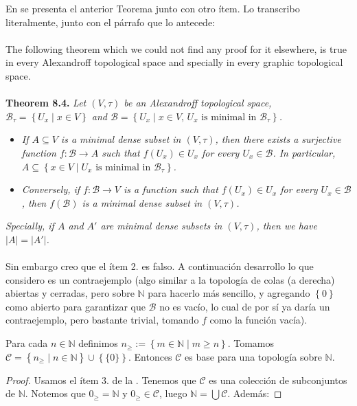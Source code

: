 \vspace{1em}
{\color[HTML]{188539}
   En \cite{jafarian2013} se presenta el anterior Teorema junto con otro ítem. Lo transcribo literalmente, junto con el párrafo que lo antecede:\\\\
The following theorem which we could not find any proof for it elsewhere, is true in every Alexandroff topological space and specially in every graphic topological space.\\\\
\textbf{Theorem 8.4.} \textit{Let $(V,\tau)$ be an Alexandroff topological space, $\mathcal{B}_\tau=\left\lbrace U_x\mid x\in V\right\rbrace$ and $\mathcal{B}=\left\lbrace U_x\mid x\in V,\, U_x \text{ is minimal in }\mathcal{B}_\tau\right\rbrace$.}
\begin{itemize}
   \item[1.] \textit{If $A\subseteq V$ is a minimal dense subset in $(V,\tau)$, then there exists a surjective function $f:\mathcal{B}\longrightarrow A$ such that $f(U_x)\in U_x$ for every $U_x\in\mathcal{B}$. In particular, $A\subseteq\left\lbrace x\in V\mid U_x \text{ is minimal in }\mathcal{B}_\tau\right\rbrace$.}
   \item[2.] \textit{Conversely, if $f:\mathcal{B}\longrightarrow V$ is a function such that $f(U_x)\in U_x$ for every $U_x\in\mathcal{B}$, then $f(\mathcal{B})$ is a minimal dense subset in $(V,\tau)$.}
\end{itemize}
\textit{Specially, if $A$ and $A'$ are minimal dense subsets in $(V,\tau)$, then we have $|A|=|A'|$.}\\\\
Sin embargo creo que el ítem 2. es falso. A continuación desarrollo lo que considero es un contraejemplo (algo similar a la topología de colas (a derecha) abiertas y cerradas, pero sobre $\mathbb{N}$ para hacerlo más sencillo, y agregando $\left\lbrace 0\right\rbrace$ como abierto para garantizar que $\mathcal{B}$ no es vacío, lo cual de por sí ya daría un contraejemplo, pero bastante trivial, tomando $f$ como la función vacía).
\begin{Prop}
   Para cada $n\in\mathbb{N}$ definimos $n_{\ge}:=\left\lbrace m\in\mathbb{N}\mid m\ge n\right\rbrace$. Tomamos $\mathcal{C}=\left\lbrace n_{\ge}\mid n\in\mathbb{N}\right\rbrace\cup\left\lbrace\{0\}\right\rbrace$. Entonces $\mathcal{C}$ es base para una topología sobre $\mathbb{N}$.
\end{Prop}
\begin{proof}
   Usamos el ítem 3. de la . Tenemos que $\mathcal{C}$ es una colección de subconjuntos de $\mathbb{N}$. Notemos que $0_{\ge}=\mathbb{N}$ y $0_{\ge}\in\mathcal{C}$, luego $\mathbb{N}=\bigcup\mathcal{C}$. Además:

\end{proof}}
